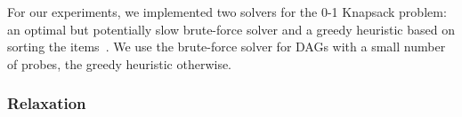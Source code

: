 



For our experiments, we implemented two solvers for the 0-1 Knapsack problem: an optimal but potentially slow brute-force solver and a
greedy heuristic based on sorting the items~\citep{dantzig57}. We use the brute-force solver for DAGs with a small number of probes, the
greedy heuristic otherwise.

\subsubsection{\WPRelaxTitle Relaxation}

